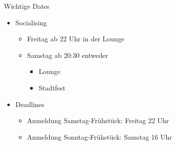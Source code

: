 \begin{frame}{Wichtige Dates}
    \begin{itemize}
        \item Socialising
        \begin{itemize}
            \item Freitag ab 22 Uhr in der Lounge
            \item Samstag ab 20:30 entweder
            \begin{itemize}
                \item Lounge
                \item Stadtfest
            \end{itemize}
        \end{itemize}
        \item Deadlines
        \begin{itemize}
            \item Anmeldung Samstag-Frühstück: Freitag 22 Uhr
            \item Anmeldung Sonntag-Frühstück: Samstag 16 Uhr
        \end{itemize}
    \end{itemize}
\end{frame}
